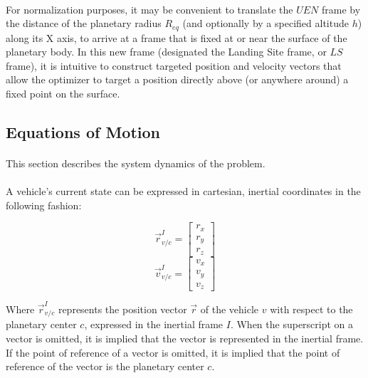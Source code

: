 \paragraph{}
For normalization purposes, it may be convenient to translate the $\mathit{UEN}$ frame by the distance of the planetary radius $R_{eq}$ (and optionally by a specified altitude $h$) along its X axis, to arrive at a frame that is fixed at or near the surface of the planetary body. In this new frame (designated the Landing Site frame, or $\mathit{LS}$ frame), it is intuitive to construct targeted position and velocity vectors that allow the optimizer to target a position directly above (or anywhere around) a fixed point on the surface.

\subsection{Equations of Motion}
\paragraph{}
This section describes the system dynamics of the problem.
\paragraph{}
A vehicle's current state can be expressed in cartesian, inertial coordinates in the following fashion:
\begin{multicols}{2}
\begin{equation}
\vec{r}_{v/c}^I = \begin{bmatrix}
r_x \\ r_y \\ r_z
\end{bmatrix}
\end{equation}
\break
\begin{equation}
\vec{v}_{v/c}^I = \begin{bmatrix}
v_x \\ v_y \\ v_z
\end{bmatrix}
\end{equation}
\end{multicols}
Where $\vec{r}_{v/c}^I$ represents the position vector $\vec{r}$ of the vehicle $v$ with respect to the planetary center $c$, expressed in the inertial frame $I$. When the superscript on a vector is omitted, it is implied that the vector is represented in the inertial frame. If the point of reference of a vector is omitted, it is implied that the point of reference of the vector is the planetary center $c$.
